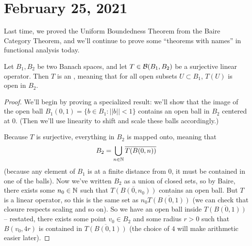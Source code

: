 \pagebreak\section{February 25, 2021}

Last time, we proved the Uniform Boundedness Theorem from the Baire Category Theorem, and we'll continue to prove some ``theorems with names'' in functional analysis today.

\begin{theorem}
Let $B_1, B_2$ be two Banach spaces, and let $T \in \mathcal{B}(B_1, B_2)$ be a surjective linear operator. Then $T$ is an , meaning that for all open subsets $U \subset B_1$, $T(U)$ is open in $B_2$.
\end{theorem}
\begin{proof}
We'll begin by proving a specialized result: we'll show that the image of the open ball $B_1(0, 1) = \{b \in B_1: ||b|| < 1\}$ contains an open ball in $B_2$ centered at $0$. (Then we'll use linearity to shift and scale these balls accordingly.)

Because $T$ is surjective, everything in $B_2$ is mapped onto, meaning that 
\[
    B_2 = \bigcup_{n \in \mathbb N} \overline{T(B(0, n))}
\]  
(because any element of $B_1$ is at a finite distance from $0$, it must be contained in one of the balls). Now we've written $B_2$ as a union of closed sets, so by Baire, there exists some $n_0 \in \mathbb N$ such that $\overline{T(B(0, n_0))}$ contains an open ball. But $T$ is a linear operator, so this is the same set as $n_0 \overline{T(B(0, 1))}$ (we can check that closure respects scaling and so on). So we have an open ball inside $\overline{T(B(0, 1))}$ -- restated, there exists some point $v_0 \in B_2$ and some radius $r > 0$ such that $B(v_0, 4r)$ is contained in $\overline{T(B(0, 1))}$ (the choice of $4$ will make arithmetic easier later). 


\end{proof}
